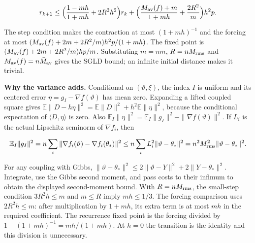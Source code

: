 \documentclass[11pt,a4paper]{report}
\begin{document}
\[r_{k+1}\le\Bigl(\frac{1-mh}{1+mh}+2R^2h^2\Bigr)r_k
+\Bigl(\frac{M_{\rm av}(f)+m}{1+mh}+\frac{2R^2}m\Bigr)h^2p.\]


The step condition makes the contraction at most \((1+mh)^{-1}\) and the
forcing at most \((M_{\rm av}(f)+2m+2R^2/m)h^2p/(1+mh)\). The fixed point is
\((M_{\rm av}(f)+2m+2R^2/m)hp/m\). Substituting \(m=n\bar m\),
\(R=nM_{\rm rms}\) and \(M_{\rm av}(f)=n\bar M_{\rm av}\) gives the SGLD
bound; an infinite initial distance makes it trivial.




\textbf{Why the variance adds.} Conditional on \((\vartheta,\xi)\), the index \(I\) is uniform and its centered error \(\eta=g_I-\nabla f(\vartheta)\) has mean zero. Expanding a lifted coupled square gives \(\mathbb E\|D-h\eta\|^2=\mathbb E\|D\|^2+h^2\mathbb E\|\eta\|^2\), because the conditional expectation of \(\langle D,\eta\rangle\) is zero. Also \(\mathbb E_I\|\eta\|^2=\mathbb E_I\|g_I\|^2-\|\nabla f(\vartheta)\|^2\). If \(L_i\) is the actual Lipschitz seminorm of \(\nabla f_i\), then

\[\mathbb E_I\|g_I\|^2=n\sum_i\|\nabla f_i(\vartheta)-\nabla f_i(\theta_*)\|^2\le n\sum_iL_i^2\|\vartheta-\theta_*\|^2=n^2M_{\rm rms}^2\|\vartheta-\theta_*\|^2.\]

For any coupling with Gibbs, \(\|\vartheta-\theta_*\|^2\le2\|\vartheta-Y\|^2+2\|Y-\theta_*\|^2\). Integrate, use the Gibbs second moment, and pass costs to their infimum to obtain the displayed second-moment bound. With \(R=nM_{\rm rms}\), the small-step condition \(3R^2h\le m\) and \(m\le R\) imply \(mh\le1/3\). The forcing comparison uses \(2R^2h\le m\): after multiplication by \(1+mh\), its extra term is at most \(mh\) in the required coefficient. The recurrence fixed point is the forcing divided by \(1-(1+mh)^{-1}=mh/(1+mh)\). At \(h=0\) the transition is the identity and this division is unnecessary.
\end{document}
